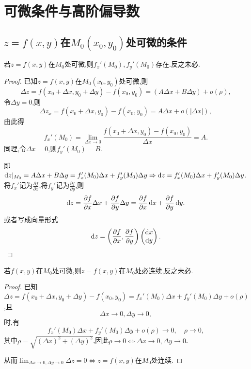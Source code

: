 \setcounter{chapter}{7}
\chapter{可微条件与高阶偏导数}

\section{$z = f(x,y)$在$M_0(x_0,y_0)$处可微的条件}

\begin{theorem}
    若$z = f(x,y)$在$M_0$处可微,则$f_x'(M_0),f_y'(M_0)$存在.反之未必.
\end{theorem}

\begin{proof}
    已知$z = f(x,y)$在$M_0(x_0,y_0)$处可微,则
    $$
    \Delta z = f(x_0 + \Delta x, y_0 + \Delta y) - f(x_0, y_0) = (A \Delta x + B \Delta y) + o(\rho),
    $$
    令$\Delta y = 0$,则
    $$
    \Delta z_x = f(x_0 + \Delta x, y_0) - f(x_0, y_0) = A \Delta x + o(|\Delta x|),
    $$
    由此得
    $$
    f_x'(M_0) = \lim_{\Delta x \to 0} \frac{f(x_0 + \Delta x, y_0) - f(x_0, y_0)}{\Delta x} = A.
    $$
    同理,令$\Delta x = 0$,则$f_y'(M_0) = B$.

    即$\operatorname{d\!} z |_{M_0} = A \Delta x + B \Delta y = f_x'(M_0) \Delta x + f_y'(M_0) \Delta y \Rightarrow \operatorname{d\!} z = f_x'(M_0) \Delta x + f_y'(M_0) \Delta y$.
    将$f_x'$记为$\frac{\partial f}{\partial x}$,将$f_y'$记为$\frac{\partial f}{\partial y}$,则
    $$
    \operatorname{d\!} z = \frac{\partial f}{\partial x} \Delta x + \frac{\partial f}{\partial y} \Delta y = \frac{\partial f}{\partial x} \operatorname{d\!} x + \frac{\partial f}{\partial y} \operatorname{d\!} y.
    $$
    或者写成向量形式
    $$
    \operatorname{d\!} z = \left( \frac{\partial f}{\partial x}, \frac{\partial f}{\partial y} \right) \begin{pmatrix}
        \operatorname{d\!} x \\
        \operatorname{d\!} y
    \end{pmatrix}.
    $$
\end{proof}

\begin{theorem}\label{thm:8.2}
    若$f(x,y)$在$M_0$处可微,则$z = f(x,y)$在$M_0$处必连续,反之未必.
\end{theorem}

\begin{proof}
    已知$\Delta z = f(x_0 + \Delta x, y_0 + \Delta y) - f(x_0, y_0) = f_x'(M_0) \Delta x + f_y'(M_0) \Delta y + o(\rho)$,且
    $$
    \Delta x \to 0, \Delta y \to 0,
    $$
    时,有
    $$
    f_x'(M_0) \Delta x + f_y'(M_0) \Delta y + o(\rho) \to 0, \quad \rho \to 0,
    $$
    其中$\rho = \sqrt{(\Delta x)^2 + (\Delta y)^2}$,因此$\rho \to 0 \Leftrightarrow \Delta x \to 0, \Delta y \to 0$.

    从而$\lim_{\Delta x \to 0, \Delta y \to 0} \Delta z = 0 \Leftrightarrow z = f(x,y)$在$M_0$处连续.
\end{proof}

